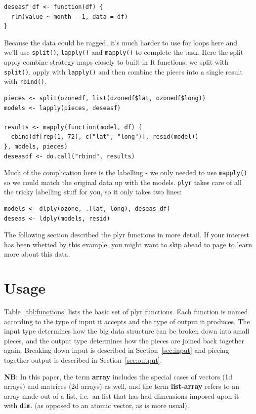 \documentclass{scrartcl}
\newcommand{\code}[1]{\lstinline!#1!}
\newcommand{\f}[1]{\lstinline!#1()!}
\newcommand{\plyr}{{\tt plyr}\xspace}
\begin{document}
\begin{verbatim}
deseasf_df <- function(df) {
  rlm(value ~ month - 1, data = df)
}
\end{verbatim}

Because the data could be ragged, it's much harder to use for loops here and  we'll use \f{split}, \f{lapply} and \f{mapply} to complete the task.  Here the split-apply-combine strategy maps closely to built-in R functions: we split with \f{split}, apply with \f{lapply} and then combine the pieces into a single result with \f{rbind}.

\begin{verbatim}
pieces <- split(ozonedf, list(ozonedf$lat, ozonedf$long))
models <- lapply(pieces, deseasf)

results <- mapply(function(model, df) {
  cbind(df[rep(1, 72), c("lat", "long")], resid(model))
}, models, pieces)
deseasdf <- do.call("rbind", results)
\end{verbatim}

Much of the complication here is the labelling - we only needed to use \f{mapply} so we could match the original data up with the models. \plyr takes care of all the tricky labelling stuff for you, so it only takes two lines:

\begin{verbatim}
models <- dlply(ozone, .(lat, long), deseas_df)
deseas <- ldply(models, resid)
\end{verbatim}

The following section described the plyr functions in more detail.  If your interest has been whetted by this example, you might want to skip ahead to page \pageref{sub:ozone} to learn more about this data.

\section{Usage}
\label{sec:usage}

Table~\ref{tbl:functions} lists the basic set of plyr functions.  Each function is named according to the type of input it accepts and the type of output it produces.  The input type determines how the big data structure can be broken down into small pieces, and the output type determines how the pieces are joined back together again.  Breaking down input is described in Section~\ref{sec:input} and piecing together output is described in Section~\ref{sec:output}.

{\bf NB}: In this paper, the term {\bf array} includes the special cases of vectors (1d arrays) and matrices (2d arrays) as well, and the term {\bf list-array} refers to an array made out of a list, i.e.\ an list that has had dimensions imposed upon it with \code{dim}.   (as opposed to an atomic vector, as is more usual).
\end{document}
